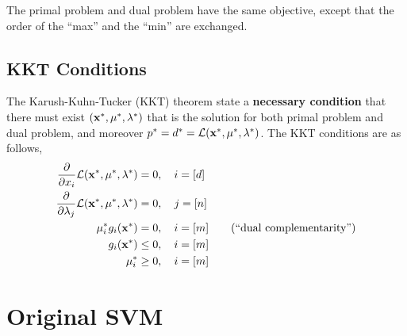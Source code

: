 The primal problem and dual problem have the same objective, except that the order of the ``max'' and the ``min'' are exchanged.

\subsection{KKT Conditions}
The Karush-Kuhn-Tucker (KKT) theorem state a \textbf{necessary condition} that there must exist $(\mathbf{x}^*, \mu^*, \lambda^*)$ that is the solution for both primal problem and dual problem, and moreover $p^* = d^* = \mathcal{L}(\mathbf{x}^*, \mu^*, \lambda^*)$. The KKT conditions are as follows,
\begin{align}
	\frac{\partial}{\partial x_i} \mathcal{L}(\mathbf{x}^*, \mu^*, \lambda^*) &= 0, \quad i = [d] \\
	\frac{\partial}{\partial \lambda_j} \mathcal{L}(\mathbf{x}^*, \mu^*, \lambda^*) &= 0, \quad j = [n] \\
	\mu^*_i g_i(\mathbf{x}^*) &= 0, \quad i = [m] \qquad (\text{``dual complementarity''}) \\
	 g_i(\mathbf{x}^*) & \leq 0, \quad i = [m] \\
	 \mu_i^* &\geq 0, \quad i = [m]
\end{align}

\section{Original SVM}
